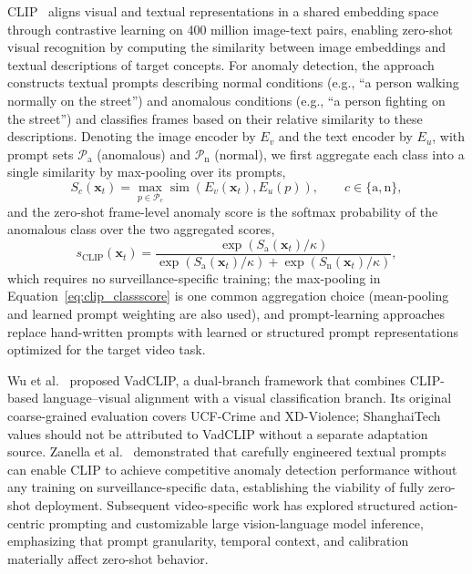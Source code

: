 \documentclass[10pt,a4paper]{article}
\begin{document}
CLIP~\citep{radford2021learning} aligns visual and textual representations in a shared embedding space through contrastive learning on 400 million image-text pairs, enabling zero-shot visual recognition by computing the similarity between image embeddings and textual descriptions of target concepts. For anomaly detection, the approach constructs textual prompts describing normal conditions (e.g., ``a person walking normally on the street'') and anomalous conditions (e.g., ``a person fighting on the street'') and classifies frames based on their relative similarity to these descriptions. Denoting the image encoder by $E_v$ and the text encoder by $E_u$, with prompt sets $\mathcal{P}_{\text{a}}$ (anomalous) and $\mathcal{P}_{\text{n}}$ (normal), we first aggregate each class into a single similarity by max-pooling over its prompts,
\begin{equation}
    S_c(\mathbf{x}_t) = \max_{p \in \mathcal{P}_c} \operatorname{sim}\!\left(E_v(\mathbf{x}_t), E_u(p)\right), \qquad c \in \{\text{a}, \text{n}\}, \label{eq:clip_classscore}
\end{equation}
and the zero-shot frame-level anomaly score is the softmax probability of the anomalous class over the two aggregated scores,
\begin{equation}
    s_{\text{CLIP}}(\mathbf{x}_t) = \frac{\exp\!\left(S_{\text{a}}(\mathbf{x}_t)/\kappa\right)}{\exp\!\left(S_{\text{a}}(\mathbf{x}_t)/\kappa\right) + \exp\!\left(S_{\text{n}}(\mathbf{x}_t)/\kappa\right)}, \label{eq:clip_score}
\end{equation}
which requires no surveillance-specific training; the max-pooling in Equation~\ref{eq:clip_classscore} is one common aggregation choice (mean-pooling and learned prompt weighting are also used), and prompt-learning approaches replace hand-written prompts with learned or structured prompt representations optimized for the target video task.

Wu et al.~\citeyearpar{wu2024vadclip} proposed VadCLIP, a dual-branch framework that combines CLIP-based language--visual alignment with a visual classification branch. Its original coarse-grained evaluation covers UCF-Crime and XD-Violence; ShanghaiTech values should not be attributed to VadCLIP without a separate adaptation source. Zanella et al.~\citeyearpar{zanella2024harnessing} demonstrated that carefully engineered textual prompts can enable CLIP to achieve competitive anomaly detection performance without any training on surveillance-specific data, establishing the viability of fully zero-shot deployment. Subsequent video-specific work has explored structured action-centric prompting and customizable large vision-language model inference, emphasizing that prompt granularity, temporal context, and calibration materially affect zero-shot behavior.
\end{document}
